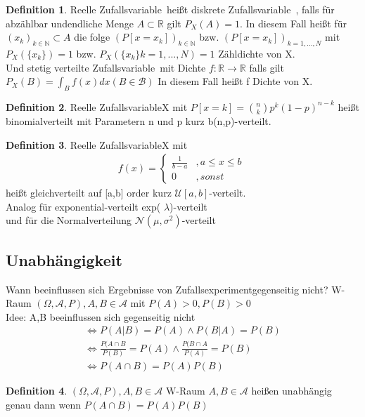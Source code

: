 \documentclass[a4paper,12pt,fleqn]{scrartcl}
\newcommand{\N}{\mathbb{N}}
\newcommand{\R}{\mathbb{R}}
\newcommand{\m}[1]{\mathcal{ #1 }}
\newcommand{\ZE}{Zufallsexperiment}
\newcommand{\ZV}{Zufallsvariable}
\theoremstyle{definition}
\newtheorem{definition}{Definition}[section]
\theoremstyle{plain}
\theoremstyle{remark}
\begin{document}
\begin{definition}
Reelle \ZV \ heißt diskrete \ZV \ , falls für abzählbar undendliche Menge $ A \subset \R $ gilt $ P_X(A) = 1 $. In diesem Fall heißt für $(x_k)_{k \in \N } \subset A $ die folge $ (P[x = x_k])_{k \in \N } $ bzw. $(P[x = x_k])_{k = 1,...,N } $ mit $P_X( \{ x_k \} ) = 1$ bzw. $P_X( \{ x_k \} k = 1,...,N ) = 1$ Zähldichte von X. \\
Und stetig verteilte \ZV \ mit Dichte $ f: \R \rightarrow \R $ falls gilt $ P_X(B) = \int_B f(x) dx ( B \in \m{B} ) $ In diesem Fall heißt f Dichte von X. 
\end{definition}

\begin{definition}
Reelle \ZV X mit $P[x = k] = \binom{n}{k} p^k (1-p)^{n-k}$ heißt binomialverteilt mit Parametern n und p kurz b(n,p)-verteilt.
\end{definition}
\begin{definition}
Reelle \ZV X mit
 \begin{align*}
f(x)=\begin{cases}\frac{1}{b-a}&,a\leq x\leq b\\
0&,sonst
\end{cases}\
\end{align*}
heißt gleichverteilt auf [a,b] order kurz $\m{U}[a,b]$-verteilt. \\
Analog für exponential-verteilt exp( $\lambda$)-verteilt \\
und für die Normalverteilung $ \m{N}( \mu , \sigma^2)$-verteilt
\end{definition}
\subsection{Unabhängigkeit}
Wann beeinflussen sich Ergebnisse von \ZE gegenseitig nicht? W-Raum $( \Omega , \m{A} , P), A,B \in \m{A} $ mit $ P(A) > 0, P(B) > 0$ \\
Idee: A,B beeinflussen sich gegenseitig nicht 
\begin{align*}
\Leftrightarrow P(A|B) = P(A) \land P(B|A) = P(B) \\
\Leftrightarrow \frac{P(A \cap B}{P(B)} = P(A) \land \frac{P(B \cap A}{P(A)} = P(B) \\
\Leftrightarrow P(A \cap B) = P(A)P(B)
\end{align*}

\begin{definition}
$( \Omega , \m{A} , P), A,B \in \m{A} $ W-Raum $ A,B \in \m{A} $ heißen unabhängig genau dann wenn $ P(A \cap B) = P(A)P(B) $
\end{definition}
\end{document}
